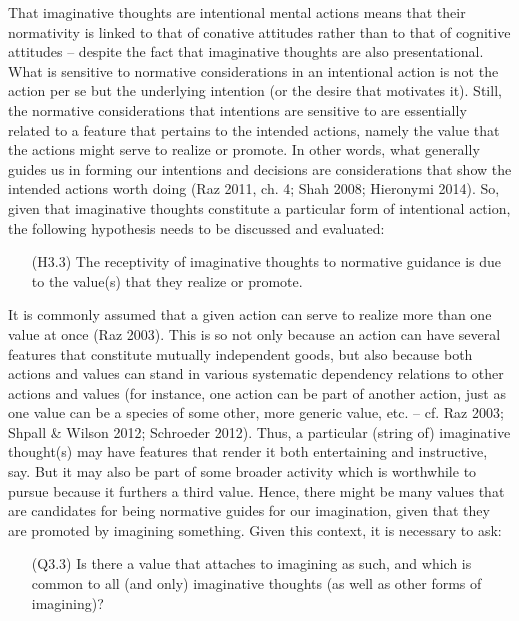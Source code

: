 \noindent That imaginative thoughts are intentional mental actions means that their normativity is linked to that of conative attitudes rather than to that of cognitive attitudes -- despite the fact that imaginative thoughts are also presentational. What is sensitive to normative considerations in an intentional action is not the action per se but the underlying intention (or the desire that motivates it). Still, the normative considerations that intentions are sensitive to are essentially related to a feature that pertains to the intended actions, namely the value that the actions might serve to realize or promote. In other words, what generally guides us in forming our intentions and decisions are considerations that show the intended actions worth doing (Raz 2011, ch. 4; Shah 2008; Hieronymi 2014). So, given that imaginative thoughts constitute a particular form of intentional action, the following hypothesis needs to be discussed and evaluated:

\vspace{-.1cm}
\begin{itemize}[leftmargin=2cm]
\item[(H3.3)] The receptivity of imaginative thoughts to normative guidance is due to the value(s) that they realize or promote.
\end{itemize}
\vspace{-.1cm}

\noindent It is commonly assumed that a given action can serve to realize more than one value at once (Raz 2003). This is so not only because an action can have several features that constitute mutually independent goods, but also because both actions and values can stand in various systematic dependency relations to other actions and values (for instance, one action can be part of another action, just as one value can be a species of some other, more generic value, etc. -- cf. Raz 2003; Shpall \& Wilson 2012; Schroeder 2012). Thus, a particular (string of) imaginative thought(s) may have features that render it both entertaining and instructive, say. But it may also be part of some broader activity which is worthwhile to pursue because it furthers a third value. Hence, there might be many values that are candidates for being normative guides for our imagination, given that they are promoted by imagining something. Given this context, it is necessary to ask:

\vspace{-.1cm}
\begin{itemize}[leftmargin=2cm]
\item[(Q3.3)] Is there a value that attaches to imagining as such, and which is common to all (and only) imaginative thoughts (as well as other forms of imagining)?
\end{itemize}
\vspace{-.1cm}

